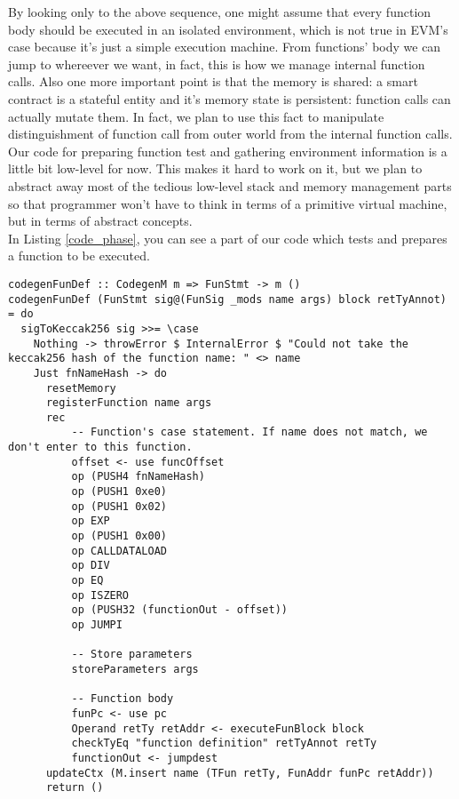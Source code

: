 \documentclass{article}
\begin{document}
By looking only to the above sequence, one might assume that every function body should be executed in an isolated environment, which is not true in EVM's case because it's just a simple execution machine. From functions' body we can jump to whereever we want, in fact, this is how we manage internal function calls. Also one more important point is that the memory is shared: a smart contract is a stateful entity and it's memory state is persistent: function calls can actually mutate them. In fact, we plan to use this fact to manipulate distinguishment of function call from outer world from the internal function calls. \\

Our code for preparing function test and gathering environment information is a little bit low-level for now. This makes it hard to work on it, but we plan to abstract away most of the tedious low-level stack and memory management parts so that programmer won't have to think in terms of a primitive virtual machine, but in terms of abstract concepts. \\

In Listing \ref{code_phase}, you can see a part of our code which tests and prepares a function to be executed.

\newpage
\begin{lstlisting}[label=code_phase,caption=Code Phase]
codegenFunDef :: CodegenM m => FunStmt -> m ()
codegenFunDef (FunStmt sig@(FunSig _mods name args) block retTyAnnot) = do
  sigToKeccak256 sig >>= \case
    Nothing -> throwError $ InternalError $ "Could not take the keccak256 hash of the function name: " <> name
    Just fnNameHash -> do
      resetMemory
      registerFunction name args
      rec
          -- Function's case statement. If name does not match, we don't enter to this function.
          offset <- use funcOffset
          op (PUSH4 fnNameHash)
          op (PUSH1 0xe0)
          op (PUSH1 0x02)
          op EXP
          op (PUSH1 0x00)
          op CALLDATALOAD
          op DIV
          op EQ
          op ISZERO
          op (PUSH32 (functionOut - offset))
          op JUMPI

          -- Store parameters
          storeParameters args
            
          -- Function body
          funPc <- use pc
          Operand retTy retAddr <- executeFunBlock block
          checkTyEq "function definition" retTyAnnot retTy
          functionOut <- jumpdest
      updateCtx (M.insert name (TFun retTy, FunAddr funPc retAddr))
      return ()
\end{lstlisting}
\end{document}
